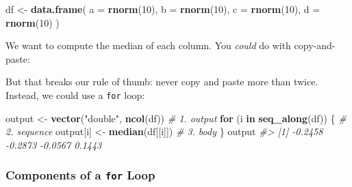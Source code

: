 \documentclass[]{book}
\newenvironment{Shaded}{\begin{snugshade}}{\end{snugshade}}
\newcommand{\CommentTok}[1]{\textcolor[rgb]{0.56,0.35,0.01}{\textit{#1}}}
\newcommand{\ControlFlowTok}[1]{\textcolor[rgb]{0.13,0.29,0.53}{\textbf{#1}}}
\newcommand{\DataTypeTok}[1]{\textcolor[rgb]{0.13,0.29,0.53}{#1}}
\newcommand{\DecValTok}[1]{\textcolor[rgb]{0.00,0.00,0.81}{#1}}
\newcommand{\KeywordTok}[1]{\textcolor[rgb]{0.13,0.29,0.53}{\textbf{#1}}}
\newcommand{\NormalTok}[1]{#1}
\newcommand{\OperatorTok}[1]{\textcolor[rgb]{0.81,0.36,0.00}{\textbf{#1}}}
\newcommand{\StringTok}[1]{\textcolor[rgb]{0.31,0.60,0.02}{#1}}
\begin{document}
\begin{Shaded}
\begin{Highlighting}[]
\NormalTok{df <-}\StringTok{ }\KeywordTok{data.frame}\NormalTok{(}
  \DataTypeTok{a =} \KeywordTok{rnorm}\NormalTok{(}\DecValTok{10}\NormalTok{),}
  \DataTypeTok{b =} \KeywordTok{rnorm}\NormalTok{(}\DecValTok{10}\NormalTok{),}
  \DataTypeTok{c =} \KeywordTok{rnorm}\NormalTok{(}\DecValTok{10}\NormalTok{),}
  \DataTypeTok{d =} \KeywordTok{rnorm}\NormalTok{(}\DecValTok{10}\NormalTok{)}
\NormalTok{)}
\end{Highlighting}
\end{Shaded}

We want to compute the median of each column. You \emph{could} do with copy-and-paste:

\begin{Shaded}
\end{Shaded}

But that breaks our rule of thumb: never copy and paste more than twice. Instead, we could use a \texttt{for} loop:

\begin{Shaded}
\begin{Highlighting}[]
\NormalTok{output <-}\StringTok{ }\KeywordTok{vector}\NormalTok{(}\StringTok{"double"}\NormalTok{, }\KeywordTok{ncol}\NormalTok{(df))  }\CommentTok{# 1. output}
\ControlFlowTok{for}\NormalTok{ (i }\ControlFlowTok{in} \KeywordTok{seq_along}\NormalTok{(df)) \{            }\CommentTok{# 2. sequence}
\NormalTok{  output[i] <-}\StringTok{ }\KeywordTok{median}\NormalTok{(df[[i]])        }\CommentTok{# 3. body}
\NormalTok{\}}
\NormalTok{output}
\CommentTok{#> [1] -0.2458 -0.2873 -0.0567  0.1443}
\end{Highlighting}
\end{Shaded}

\hypertarget{components-of-a-for-loop}{%
\subsubsection*{\texorpdfstring{Components of a \texttt{for} Loop}{Components of a for Loop}}\label{components-of-a-for-loop}}
\end{document}
